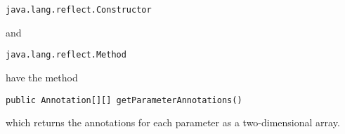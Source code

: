 \documentclass[a4paper, 10pt, titlepage]{scrartcl} %
\begin{document}
\begin{scriptsize}\verb|java|\hspace{0.0pt}\verb|.|\hspace{0.0pt}\verb|lang|\hspace{0.0pt}\verb|.|\hspace{0.0pt}\verb|reflect|\hspace{0.0pt}\verb|.|\hspace{0.0pt}\verb|Constructor|\end{scriptsize} and \begin{scriptsize}\verb|java|\hspace{0.0pt}\verb|.|\hspace{0.0pt}\verb|lang|\hspace{0.0pt}\verb|.|\hspace{0.0pt}\verb|reflect|\hspace{0.0pt}\verb|.|\hspace{0.0pt}\verb|Method|\end{scriptsize} have the
method \begin{scriptsize}\verb|public|\hspace{0.0pt}\verb| |\hspace{0.0pt}\verb|Annotation|\hspace{0.0pt}\verb|[|\hspace{0.0pt}\verb||\hspace{0.0pt}\verb|]|\hspace{0.0pt}\verb||\hspace{0.0pt}\verb|[|\hspace{0.0pt}\verb||\hspace{0.0pt}\verb|]|\hspace{0.0pt}\verb||\hspace{0.0pt}\verb| |\hspace{0.0pt}\verb|getParameterAnnotations|\hspace{0.0pt}\verb|(|\hspace{0.0pt}\verb||\hspace{0.0pt}\verb|)|\hspace{0.0pt}\verb||\end{scriptsize} which returns the
annotations for each parameter as a two-dimensional array.
\end{document}
